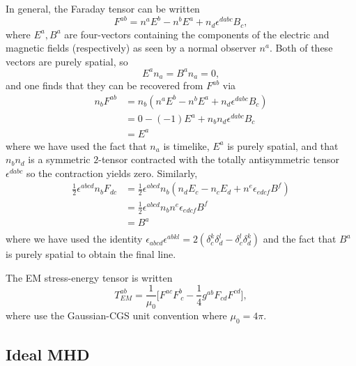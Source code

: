 \documentclass[12pt]{article}
\numberwithin{equation}{section}
\begin{document}
In general, the Faraday tensor can be written
\begin{equation}
F^{ab} = n^a E^b - n^b E^a + n_d \epsilon^{dabc} B_c,
\end{equation}
where $E^a, B^a$ are four-vectors containing the components of the electric and magnetic fields (respectively) as seen by a normal observer $n^a$.
Both of these vectors are purely spatial, so
\begin{equation}
E^a n_a = B^a n_a = 0,
\end{equation}
and one finds that they can be recovered from $F^{ab}$ via
\begin{equation}
\begin{aligned}
n_b F^{ab} &= n_b (n^a E^b - n^b E^a + n_d \epsilon^{dabc} B_c) \\
&= 0 - (-1) E^a + n_b n_d \epsilon^{dabc} B_c \\
&= E^{a}
\end{aligned}
\end{equation}
where we have used the fact that $n_a$ is timelike, $E^{a}$ is purely spatial, and that $n_b n_d$ is a symmetric $2$-tensor contracted with the totally antisymmetric tensor $\epsilon^{dabc}$ so the contraction yields zero.
Similarly, 
\begin{equation}
\begin{aligned}
\frac{1}{2} \epsilon^{abcd} n_b F_{dc} &= \frac{1}{2} \epsilon^{abcd} n_b (n_d E_c - n_c E_d + n^e \epsilon_{edcf} B^f) \\
&= \frac{1}{2} \epsilon^{abcd} n_b n^e \epsilon_{edcf} B^f \\
&= B^a \\
\end{aligned}
\end{equation}
where we have used the identity $\epsilon_{abcd} \epsilon^{abkl} = 2 (\delta^{k}_{c} \delta^{l}_{d} - \delta^{l}_{c} \delta^{k}_{d})$ and the fact that $B^a$ is purely spatial to obtain the final line.

The EM stress-energy tensor is written
\begin{equation}
T^{ab}_{EM} = \frac{1}{\mu_0} \Big[ F^{a c} F^{b}_{~c} - \frac{1}{4} g^{ab} F_{cd} F^{cd} \Big],
\end{equation}
where \cite{BaumgarteShapiro,Deppe22} use the Gaussian-CGS unit convention where $\mu_0 = 4 \pi$.

\subsection{Ideal MHD}
\end{document}

